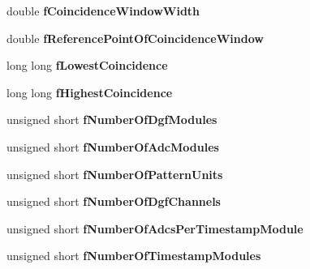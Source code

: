 \begin{DoxyCompactItemize}
\item 
\hypertarget{class_global_settings_aa4ea12bfdc34312dcb279bdf2efbcbb3}{double {\bfseries f\-Coincidence\-Window\-Width}}\label{class_global_settings_aa4ea12bfdc34312dcb279bdf2efbcbb3}

\item 
\hypertarget{class_global_settings_a83d940cc19cbd1a4df880d0f4bb9f7ab}{double {\bfseries f\-Reference\-Point\-Of\-Coincidence\-Window}}\label{class_global_settings_a83d940cc19cbd1a4df880d0f4bb9f7ab}

\item 
\hypertarget{class_global_settings_ad933baf31ffb6ce12452fb48e78aae9c}{long long {\bfseries f\-Lowest\-Coincidence}}\label{class_global_settings_ad933baf31ffb6ce12452fb48e78aae9c}

\item 
\hypertarget{class_global_settings_a8038987280b1ee7f8d4244c9f5c69020}{long long {\bfseries f\-Highest\-Coincidence}}\label{class_global_settings_a8038987280b1ee7f8d4244c9f5c69020}

\item 
\hypertarget{class_global_settings_a88d5191ef09e0c4889aaac6ce4f2efce}{unsigned short {\bfseries f\-Number\-Of\-Dgf\-Modules}}\label{class_global_settings_a88d5191ef09e0c4889aaac6ce4f2efce}

\item 
\hypertarget{class_global_settings_af5fac6b4659c9023f6bf3cdfb9d79b44}{unsigned short {\bfseries f\-Number\-Of\-Adc\-Modules}}\label{class_global_settings_af5fac6b4659c9023f6bf3cdfb9d79b44}

\item 
\hypertarget{class_global_settings_a6d3aad60ff241be473e4fef0eb9575fd}{unsigned short {\bfseries f\-Number\-Of\-Pattern\-Units}}\label{class_global_settings_a6d3aad60ff241be473e4fef0eb9575fd}

\item 
\hypertarget{class_global_settings_a19360b8664f3baa1adcf6b8252f45d35}{unsigned short {\bfseries f\-Number\-Of\-Dgf\-Channels}}\label{class_global_settings_a19360b8664f3baa1adcf6b8252f45d35}

\item 
\hypertarget{class_global_settings_ae3d4548748ddb92df4cdb1690a99cb34}{unsigned short {\bfseries f\-Number\-Of\-Adcs\-Per\-Timestamp\-Module}}\label{class_global_settings_ae3d4548748ddb92df4cdb1690a99cb34}

\item 
\hypertarget{class_global_settings_af1c870cfde3e88bf42fb5db20301863a}{unsigned short {\bfseries f\-Number\-Of\-Timestamp\-Modules}}\label{class_global_settings_af1c870cfde3e88bf42fb5db20301863a}


\end{DoxyCompactItemize}
